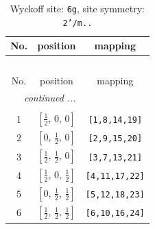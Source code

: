 \documentclass[fleqn,8pt]{jsarticle}
\begin{document}
\renewcommand{\arraystretch}{1.2}
\begin{longtable}{ccc}
\caption{Wyckoff site: {\tt 6g}, site symmetry: {\tt 2'/m..}}
 \\
 \hline \hline
No. & position & mapping \\ \hline \endfirsthead

\multicolumn{2}{l}{\tablename\ \thetable{}} \\
 \hline \hline
No. & position & mapping \\ \hline \endhead

 \hline \hline
\multicolumn{2}{r}{\footnotesize\it continued ...} \\ \endfoot

 \hline \hline
\multicolumn{2}{r}{} \\ \endlastfoot

1 & $\left[ \frac{1}{2},\, 0,\, 0 \right]$ & {\tt [1,8,14,19]} \\ \hline
2 & $\left[ 0,\, \frac{1}{2},\, 0 \right]$ & {\tt [2,9,15,20]} \\ \hline
3 & $\left[ \frac{1}{2},\, \frac{1}{2},\, 0 \right]$ & {\tt [3,7,13,21]} \\ \hline
4 & $\left[ \frac{1}{2},\, 0,\, \frac{1}{2} \right]$ & {\tt [4,11,17,22]} \\ \hline
5 & $\left[ 0,\, \frac{1}{2},\, \frac{1}{2} \right]$ & {\tt [5,12,18,23]} \\ \hline
6 & $\left[ \frac{1}{2},\, \frac{1}{2},\, \frac{1}{2} \right]$ & {\tt [6,10,16,24]} \\
\end{longtable}
\renewcommand{\arraystretch}{1.2}
\end{document}
